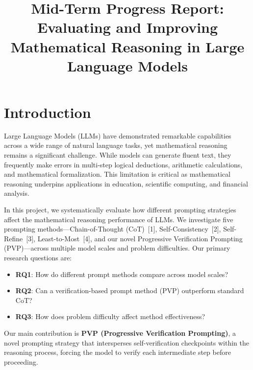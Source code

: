 \documentclass[conference]{IEEEtran}
\begin{document}
\title{Mid-Term Progress Report: Evaluating and Improving Mathematical Reasoning in Large Language Models}

\author{
}

\maketitle

\section{Introduction}

Large Language Models (LLMs) have demonstrated remarkable capabilities across a wide range of natural language tasks, yet mathematical reasoning remains a significant challenge. While models can generate fluent text, they frequently make errors in multi-step logical deductions, arithmetic calculations, and mathematical formalization. This limitation is critical as mathematical reasoning underpins applications in education, scientific computing, and financial analysis.

In this project, we systematically evaluate how different prompting strategies affect the mathematical reasoning performance of LLMs. We investigate five prompting methods---Chain-of-Thought (CoT)~[1], Self-Consistency~[2], Self-Refine~[3], Least-to-Most~[4], and our novel Progressive Verification Prompting (PVP)---across multiple model scales and problem difficulties. Our primary research questions are:

\begin{itemize}
    \item \textbf{RQ1}: How do different prompt methods compare across model scales?
    \item \textbf{RQ2}: Can a verification-based prompt method (PVP) outperform standard CoT?
    \item \textbf{RQ3}: How does problem difficulty affect method effectiveness?
\end{itemize}

Our main contribution is \textbf{PVP (Progressive Verification Prompting)}, a novel prompting strategy that intersperses self-verification checkpoints within the reasoning process, forcing the model to verify each intermediate step before proceeding.
\end{document}
